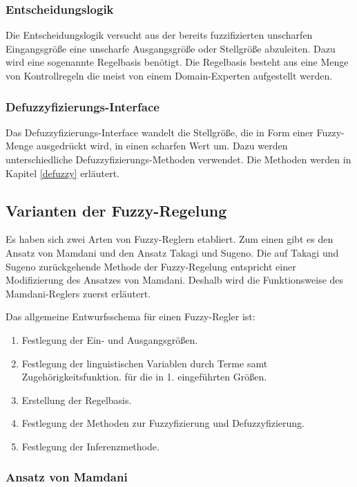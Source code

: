 \documentclass[12pt,a4paper,bibliography=totocnumbered,listof=totocnumbered, abstracton]{scrartcl}
\theoremstyle{Umgebung}
\begin{document}
\subsubsection{Entscheidungslogik}

Die Entscheidungslogik versucht aus der bereits fuzzifizierten unscharfen Eingangsgröße eine unscharfe Ausgangsgröße oder Stellgröße abzuleiten. Dazu wird eine sogenannte Regelbasis benötigt. Die Regelbasis besteht aus eine Menge von Kontrollregeln die meist von einem Domain-Experten aufgestellt werden.

\subsubsection{Defuzzyfizierungs-Interface}

Das Defuzzyfizierungs-Interface wandelt die Stellgröße, die in Form einer Fuzzy-Menge ausgedrückt wird, in einen scharfen Wert um. Dazu werden unterschiedliche Defuzzyfizierungs-Methoden verwendet. Die Methoden werden in Kapitel \ref{defuzzy} erläutert.


\subsection{Varianten der Fuzzy-Regelung}

Es haben sich zwei Arten von Fuzzy-Reglern etabliert. Zum einen gibt es den Ansatz von Mamdani und den Ansatz Takagi und Sugeno. Die auf Takagi und Sugeno zurückgehende Methode der Fuzzy-Regelung entspricht einer Modifizierung des Ansatzes von Mamdani. Deshalb wird die Funktionsweise des Mamdani-Reglers zuerst erläutert.

Das allgemeine Entwurfsschema für einen Fuzzy-Regler ist:

\begin{enumerate} 
	\item Festlegung der Ein- und Ausgangsgrößen.
	\item Festlegung der linguistischen Variablen durch Terme samt Zugehörigkeitsfunktion.
	für die in 1. eingeführten Größen.
	\item Erstellung der Regelbasis.
	\item Festlegung der Methoden zur Fuzzyfizierung und Defuzzyfizierung.
	\item Festlegung der Inferenzmethode.
\end{enumerate}

\subsubsection{Ansatz von Mamdani}
\end{document}
